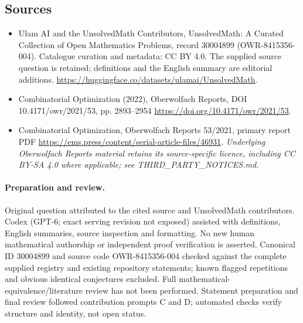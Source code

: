 \documentclass[11pt]{article}
\begin{document}
\subsection{Sources}
\begin{itemize}
\item[\hypertarget{source:30004899:1}{S1}] Ulam AI and the UnsolvedMath Contributors, UnsolvedMath: A Curated Collection of Open Mathematics Problems, record 30004899 (OWR-8415356-004). Catalogue curation and metadata: CC BY 4.0. The supplied source question is retained; definitions and the English summary are editorial additions.
\url{https://huggingface.co/datasets/ulamai/UnsolvedMath}.
\item[\hypertarget{source:30004899:2}{S2}] Combinatorial Optimization (2022), Oberwolfach Reports, DOI 10.4171/owr/2021/53, pp. 2893--2954
\url{https://doi.org/10.4171/owr/2021/53}.
\item[\hypertarget{source:30004899:3}{S3}] Combinatorial Optimization, Oberwolfach Reports 53/2021, primary report PDF
\url{https://ems.press/content/serial-article-files/46931}.
\textit{Underlying Oberwolfach Reports material retains its source-specific licence, including CC BY-SA 4.0 where applicable; see THIRD\_PARTY\_NOTICES.md.}
\end{itemize}
\paragraph{Preparation and review.}
Original question attributed to the cited source and UnsolvedMath contributors. Codex (GPT-6; exact serving revision not exposed) assisted with definitions, English summaries, source inspection and formatting. No new human mathematical authorship or independent proof verification is asserted. Canonical ID 30004899 and source code OWR-8415356-004 checked against the complete supplied registry and existing repository statements; known flagged repetitions and obvious identical conjectures excluded. Full mathematical-equivalence/literature review has not been performed. Statement preparation and final review followed contribution prompts C and D; automated checks verify structure and identity, not open status.
\label{end:30004899}
\end{document}
